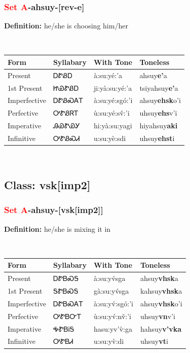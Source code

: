 \subsubsection*{\textcolor{Red}{Set A}{-}\textbf{ahsuy}{-}[rev-e]}
\nopagebreak
\textbf{Definition: } he/she is choosing him/her
\\[0.5em]
\begin{tabularx}{\textwidth}{l X X X}%
\toprule%
\textbf{Form}&\textbf{Syllabary}&\textbf{With Tone}&\textbf{Toneless}\\%
\midrule%
Present&ᎠᏑᏰᎠ&à:su:yé:’a&ahsuy\textbf{e'}a\\%
1st Present&ᏥᏯᏑᏰᎠ&ji:yà:su:yé:’a&tsiyahsuy\textbf{e'}a\\%
Imperfective&ᎠᏑᏰᏍᎪᎢ&à:su:yé:sgó:’i&ahsuy\textbf{ehsk}o'i\\%
Perfective&ᎤᏑᏰᏒᎢ&ù:su:yé:sv̌:’i&uhsuy\textbf{ehs}v'i\\%
Imperative&ᎯᏯᏑᏯᎩ&hi:yà:su:yagi&hiyahsuy\textbf{aki}\\%
Infinitive&ᎤᏑᏰᏍᏗ&u:su:yè:sdi&uhsuy\textbf{ehst}i\\%
\bottomrule%
\end{tabularx}
\\[1em]
\needspace{3in}
\subsection*{Class: vsk[imp2]}
\nopagebreak
\needspace{2in}
\subsubsection*{\textcolor{Red}{Set A}{-}\textbf{ahsuy}{-}[vsk[imp2]]}
\nopagebreak
\textbf{Definition: } he/she is mixing it in
\\[0.5em]
\begin{tabularx}{\textwidth}{l X X X}%
\toprule%
\textbf{Form}&\textbf{Syllabary}&\textbf{With Tone}&\textbf{Toneless}\\%
\midrule%
Present&ᎠᏑᏴᏍᎦ&à:su:yv́sga&ahsuy\textbf{vhsk}a\\%
1st Present&ᎦᏑᏴᏍᎦ&gà:su:yv́sga&kahsuy\textbf{vhsk}a\\%
Imperfective&ᎠᏑᏴᏍᎪᎢ&à:su:yv́:sgó:’i&ahsuy\textbf{vhsk}o'i\\%
Perfective&ᎤᏑᏴᏅᎢ&ù:su:yv́:nv̌:’i&uhsuy\textbf{vn}v'i\\%
Imperative&ᎭᏑᏴᎥᎦ&hasu:yv’v̀:ga&hahsuy\textbf{v'vka}\\%
Infinitive&ᎤᏑᏴᏗ&u:su:yv̀:di&uhsuy\textbf{vt}i\\%
\bottomrule%
\end{tabularx}
\\[1em]